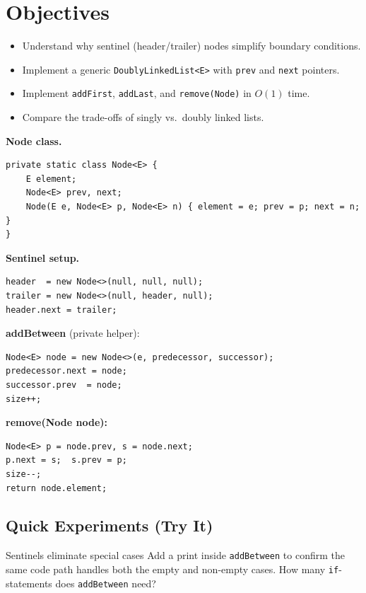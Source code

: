 \documentclass[11pt]{article}
\begin{document}
\labheader

\section*{Objectives}
\begin{itemize}[leftmargin=*,nosep]
  \item Understand why sentinel (header/trailer) nodes simplify boundary conditions.
  \item Implement a generic \texttt{DoublyLinkedList<E>} with \texttt{prev} and \texttt{next} pointers.
  \item Implement \texttt{addFirst}, \texttt{addLast}, and \texttt{remove(Node)} in $O(1)$ time.
  \item Compare the trade-offs of singly vs.\ doubly linked lists.
\end{itemize}

\begin{summary}
\textbf{Node class.}
\begin{lstlisting}
private static class Node<E> {
    E element;
    Node<E> prev, next;
    Node(E e, Node<E> p, Node<E> n) { element = e; prev = p; next = n; }
}
\end{lstlisting}

\textbf{Sentinel setup.}
\begin{lstlisting}
header  = new Node<>(null, null, null);
trailer = new Node<>(null, header, null);
header.next = trailer;
\end{lstlisting}

\textbf{addBetween} (private helper):
\begin{lstlisting}
Node<E> node = new Node<>(e, predecessor, successor);
predecessor.next = node;
successor.prev  = node;
size++;
\end{lstlisting}

\textbf{remove(Node node):}
\begin{lstlisting}
Node<E> p = node.prev, s = node.next;
p.next = s;  s.prev = p;
size--;
return node.element;
\end{lstlisting}
\end{summary}

\subsection*{Quick Experiments (Try It)}

\begin{tryit}{Sentinels eliminate special cases}
Add a print inside \texttt{addBetween} to confirm the same code path handles both the
empty and non-empty cases. How many \texttt{if}-statements does \texttt{addBetween} need?
\end{tryit}
\end{document}
